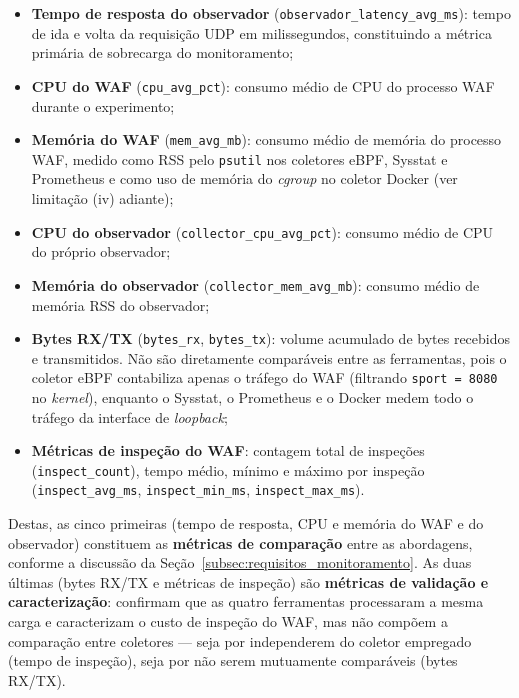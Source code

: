 \begin{itemize}
    \item \textbf{Tempo de resposta do observador} (\texttt{observador\_latency\_avg\_ms}): tempo de ida e volta da requisição UDP em milissegundos, constituindo a métrica primária de sobrecarga do monitoramento;
    \item \textbf{CPU do WAF} (\texttt{cpu\_avg\_pct}): consumo médio de CPU do processo WAF durante o experimento;
    \item \textbf{Memória do WAF} (\texttt{mem\_avg\_mb}): consumo médio de memória do processo WAF, medido como RSS pelo \texttt{psutil} nos coletores eBPF, Sysstat e Prometheus e como uso de memória do \textit{cgroup} no coletor Docker (ver limitação (iv) adiante);
    \item \textbf{CPU do observador} (\texttt{collector\_cpu\_avg\_pct}): consumo médio de CPU do próprio observador;
    \item \textbf{Memória do observador} (\texttt{collector\_mem\_avg\_mb}): consumo médio de memória RSS do observador;
    \item \textbf{Bytes RX/TX} (\texttt{bytes\_rx}, \texttt{bytes\_tx}): volume acumulado de bytes recebidos e transmitidos. Não são diretamente comparáveis entre as ferramentas, pois o coletor eBPF contabiliza apenas o tráfego do WAF (filtrando \texttt{sport = 8080} no \textit{kernel}), enquanto o Sysstat, o Prometheus e o Docker medem todo o tráfego da interface de \textit{loopback};
    \item {\raggedright\textbf{Métricas de inspeção do WAF}: contagem total de inspeções (\texttt{inspect\_count}), tempo médio, mínimo e máximo por inspeção (\texttt{inspect\_avg\_ms}, \texttt{inspect\_min\_ms}, \texttt{inspect\_max\_ms}).\par}
\end{itemize}

Destas, as cinco primeiras (tempo de resposta, CPU e memória do WAF e do observador) constituem as \textbf{métricas de comparação} entre as abordagens, conforme a discussão da Seção~\ref{subsec:requisitos_monitoramento}. As duas últimas (bytes RX/TX e métricas de inspeção) são \textbf{métricas de validação e caracterização}: confirmam que as quatro ferramentas processaram a mesma carga e caracterizam o custo de inspeção do WAF, mas não compõem a comparação entre coletores --- seja por independerem do coletor empregado (tempo de inspeção), seja por não serem mutuamente comparáveis (bytes RX/TX).

